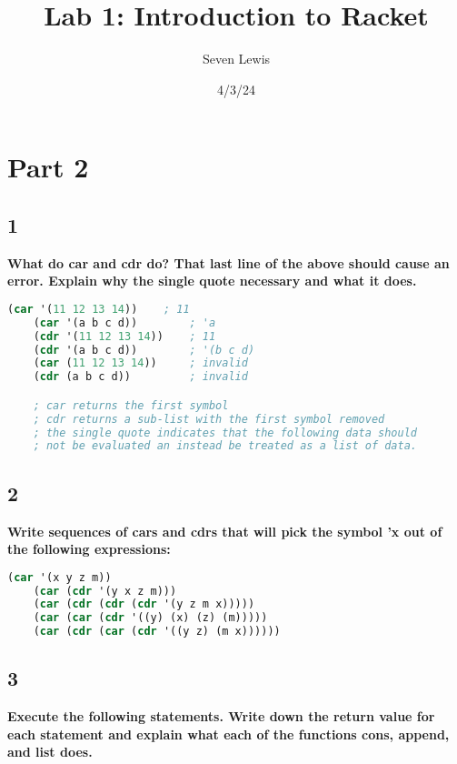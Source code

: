 \documentclass{article}
\title{Lab 1: Introduction to Racket}
\author{Seven Lewis}
\date{4/3/24}
\begin{document}
\maketitle


\section*{Part 2}
\subsection*{1}
\begin{adjustwidth}{2em}{0em}
    \textbf{What do car and cdr do? That last line of the above should cause an error. Explain why the single quote necessary and what it does.} 
\end{adjustwidth}


\begin{lstlisting}[language=lisp,style=redStyle]
    (car '(11 12 13 14))    ; 11
    (car '(a b c d))        ; 'a
    (cdr '(11 12 13 14))    ; 11
    (cdr '(a b c d))        ; '(b c d)
    (car (11 12 13 14))     ; invalid
    (cdr (a b c d))         ; invalid

    ; car returns the first symbol
    ; cdr returns a sub-list with the first symbol removed
    ; the single quote indicates that the following data should
    ; not be evaluated an instead be treated as a list of data.
\end{lstlisting}

\subsection*{2}
\begin{adjustwidth}{2em}{0em}
    \textbf{Write sequences of cars and cdrs that will pick the symbol 'x out of the following expressions:}
\end{adjustwidth}

\begin{lstlisting}[language=lisp,style=redStyle]
    (car '(x y z m))
    (car (cdr '(y x z m)))
    (car (cdr (cdr (cdr '(y z m x)))))
    (car (car (cdr '((y) (x) (z) (m)))))
    (car (cdr (car (cdr '((y z) (m x))))))
\end{lstlisting}

\subsection*{3}
\begin{adjustwidth}{2em}{0em}
    \textbf{Execute the following statements. Write down the return value for each statement and explain what each of the functions cons, append, and list does.}
\end{adjustwidth}
\end{document}
